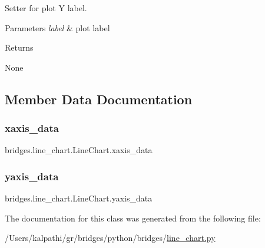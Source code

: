 Setter for plot Y label. 


\begin{DoxyParams}{Parameters}
{\em label} & plot label \\
\hline
\end{DoxyParams}
\begin{DoxyReturn}{Returns}


None 
\end{DoxyReturn}


\subsection{Member Data Documentation}
\mbox{\label{classbridges_1_1line__chart_1_1_line_chart_a13a52ecfbe82477fd6203aaa7569c1c7}} 
\subsubsection{\texorpdfstring{xaxis\_data}{xaxis\_data}}
{\footnotesize\ttfamily bridges.\+line\+\_\+chart.\+Line\+Chart.\+xaxis\+\_\+data}

\mbox{\label{classbridges_1_1line__chart_1_1_line_chart_ae32afdcdfe6398ef247f9431de603495}} 
\subsubsection{\texorpdfstring{yaxis\_data}{yaxis\_data}}
{\footnotesize\ttfamily bridges.\+line\+\_\+chart.\+Line\+Chart.\+yaxis\+\_\+data}



The documentation for this class was generated from the following file\+:\begin{DoxyCompactItemize}
\item 
/\+Users/kalpathi/gr/bridges/python/bridges/\mbox{\hyperlink{line__chart_8py}{line\+\_\+chart.\+py}}\end{DoxyCompactItemize}
